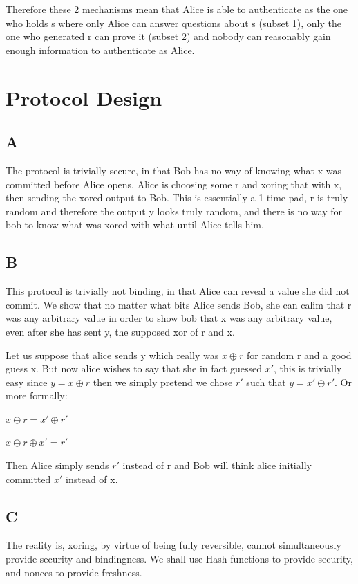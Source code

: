 \documentclass{article}
\begin{document}
Therefore these 2 mechanisms mean that Alice is able to authenticate as the one who holds s where only Alice can answer questions about s (subset 1), only the one who generated r can prove it (subset 2) and nobody can reasonably gain enough information to authenticate as Alice.

\section{Protocol Design}

\subsection*{A}
The protocol is trivially secure, in that Bob has no way of knowing what x was committed before Alice opens.
Alice is choosing some r and xoring that with x, then sending the xored output to Bob.
This is essentially a 1-time pad, r is truly random and therefore the output y looks truly random, and there is no way for bob to know what was xored with what until Alice tells him.

\subsection*{B}
This protocol is trivially not binding, in that Alice can reveal a value she did not commit.
We show that no matter what bits Alice sends Bob, she can calim that r was any arbitrary value in order to show bob that x was any arbitrary value, even after she has sent y, the supposed xor of r and x.

Let us suppose that alice sends y which really was $x \oplus r$ for random r and a good guess x.
But now alice wishes to say that she in fact guessed $x'$, this is trivially easy since $y = x \oplus r$ then we simply pretend we chose $r'$ such that $y = x' \oplus r'$.
Or more formally:

$x \oplus r = x' \oplus r'$

$x \oplus r \oplus x' = r'$

Then Alice simply sends $r'$ instead of r and Bob will think alice initially committed $x'$ instead of x.

\subsection*{C}

The reality is, xoring, by virtue of being fully reversible, cannot simultaneously provide security and bindingness.
We shall use Hash functions to provide security, and nonces to provide freshness.
\end{document}
